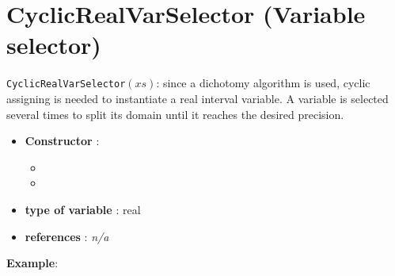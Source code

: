 \section{CyclicRealVarSelector (Variable selector)}\label{cyclicrealvarselector:cyclicrealvarselectorvarselector}\hypertarget{cyclicrealvarselector:cyclicrealvarselectorvarselector}{}
\begin{notedef}
  \texttt{CyclicRealVarSelector}$(xs)$: since a dichotomy algorithm is used, cyclic assigning is needed to instantiate a real interval variable. A variable is selected several times to split its domain until it reaches the desired precision.
\end{notedef}

\begin{itemize}
	\item \textbf{Constructor} : 
	\begin{itemize}
	\item {}
	\item {}
	\end{itemize}	
	\item \textbf{type of variable} : real
	\item \textbf{references} : \emph{n/a}
\end{itemize}

\textbf{Example}:
%

